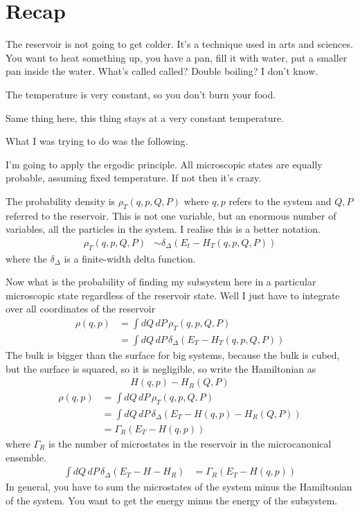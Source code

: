 \section{Recap}
The reservoir is not going to get colder.
It's a technique used in arts and sciences.
You want to heat something up,
you have a pan,
fill it with water,
put a smaller pan inside the water.
What's called called?
Double boiling?
I don't know.

The temperature is very constant,
so you don't burn your food.

Same thing here,
this thing stays at a very constant temperature.

What I was trying to do was the following.

I'm going to apply the ergodic principle.
All microscopic states are equally probable,
assuming fixed temperature.
If not then it's crazy.


The probability density is $ \rho_T (q, p, Q, P)$
where $q,p$ refers to the system and $Q,P$ referred to the reservoir.
This is not one variable,
but an enormous number of variables,
all the particles in the system.
I realise this is a better notation.
\begin{align}
    \rho_T (q, p, Q, P) &\sim
    \delta_\Delta(E_t - H_T(q,p,Q,P))
\end{align}
where the $\delta_\Delta$ is a finite-width delta function.

Now what is the probability of finding my subsystem here in a particular
microscopic state regardless of the reservoir state.
Well I just have to integrate over all coordinates of the reservoir
\begin{align}
    \rho(q, p) &=
    \int dQ\, dP\,
    \rho_T(q, p, Q, P)\\
    &=
    \int dQ\, dP\,
    \delta_\Delta\left( E_T - H_T(q, p, Q, P) \right)
\end{align}
The bulk is bigger than the surface for big systems,
because the bulk is cubed,
but the surface is squared,
so it is negligible,
so write the Hamiltonian as
\begin{align}
    H(q, p) - H_R(Q,P)
\end{align}
\begin{align}
    \rho(q, p) &=
    \int dQ\, dP\,
    \rho_T(q, p, Q, P)\\
    &=
    \int dQ\, dP\,
    \delta_\Delta\left( E_T - H(q, p) - H_R(Q, P)\right)\\
    &= \Gamma_R \left( E_T - H(q, p) \right)
\end{align}
where $\Gamma_R$ is the number of microstates in the reservoir in the
microcanonical ensemble.
\begin{align}
    \int dQ\, dP\, \delta_\Delta\left( E_T - H - H_R \right)
    &= \Gamma_R \left( E_T - H(q, p) \right)
\end{align}
In general,
you have to sum the microstates of the system minus the Hamiltonian of the
system.
You want to get the energy minus the energy of the subsystem.

